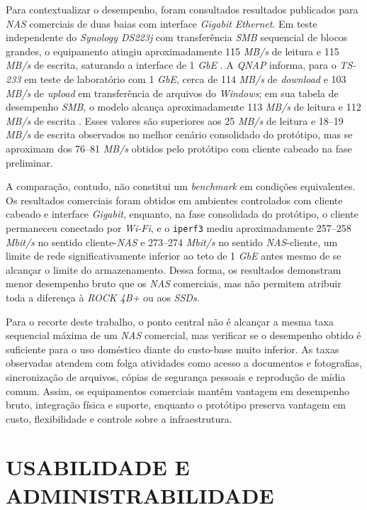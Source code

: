 Para contextualizar o desempenho, foram consultados resultados publicados para \textit{NAS} comerciais de duas baias com interface \textit{Gigabit Ethernet}. Em teste independente do \textit{Synology DS223j} com transferência \textit{SMB} sequencial de blocos grandes, o equipamento atingiu aproximadamente 115 \textit{MB/s} de leitura e 115 \textit{MB/s} de escrita, saturando a interface de 1 \textit{GbE} \cite{storagereview2026}. A \textit{QNAP} informa, para o \textit{TS-233} em teste de laboratório com 1 \textit{GbE}, cerca de 114 \textit{MB/s} de \textit{download} e 103 \textit{MB/s} de \textit{upload} em transferência de arquivos do \textit{Windows}; em sua tabela de desempenho \textit{SMB}, o modelo alcança aproximadamente 113 \textit{MB/s} de leitura e 112 \textit{MB/s} de escrita \cite{qnap2026product,qnap2026performance}. Esses valores são superiores aos 25 \textit{MB/s} de leitura e 18--19 \textit{MB/s} de escrita observados no melhor cenário consolidado do protótipo, mas se aproximam dos 76--81 \textit{MB/s} obtidos pelo protótipo com cliente cabeado na fase preliminar.

A comparação, contudo, não constitui um \textit{benchmark} em condições equivalentes. Os resultados comerciais foram obtidos em ambientes controlados com cliente cabeado e interface \textit{Gigabit}, enquanto, na fase consolidada do protótipo, o cliente permaneceu conectado por \textit{Wi-Fi}, e o \texttt{iperf3} mediu aproximadamente 257--258 \textit{Mbit/s} no sentido cliente-\textit{NAS} e 273--274 \textit{Mbit/s} no sentido \textit{NAS}-cliente, um limite de rede significativamente inferior ao teto de 1 \textit{GbE} antes mesmo de se alcançar o limite do armazenamento. Dessa forma, os resultados demonstram menor desempenho bruto que os \textit{NAS} comerciais, mas não permitem atribuir toda a diferença à \textit{ROCK 4B+} ou aos \textit{SSDs}.

Para o recorte deste trabalho, o ponto central não é alcançar a mesma taxa sequencial máxima de um \textit{NAS} comercial, mas verificar se o desempenho obtido é suficiente para o uso doméstico diante do custo-base muito inferior. As taxas observadas atendem com folga atividades como acesso a documentos e fotografias, sincronização de arquivos, cópias de segurança pessoais e reprodução de mídia comum. Assim, os equipamentos comerciais mantêm vantagem em desempenho bruto, integração física e suporte, enquanto o protótipo preserva vantagem em custo, flexibilidade e controle sobre a infraestrutura.

\clearpage
\section{USABILIDADE E ADMINISTRABILIDADE}

